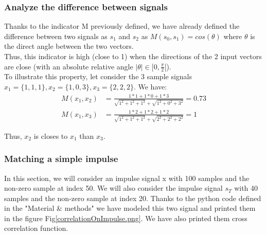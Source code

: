 \documentclass[a4paper]{article}
\begin{document}
    \subsubsection{Analyze the difference between signals}
    Thanks to the indicator M previously defined, we have already defined the difference between two signals as $s_{1}$ and $s_{2}$ as $M(s_{0}, s_{1})	= cos(\theta)$
    where $\theta$ is the direct angle between the two vectors.\\
    Thus, this indicator is high (close to 1) when the directions of the 2 input vectors are close (with an absolute relative angle $|\theta| \in [0, \frac{\pi}{2}[$).\\
    To illustrate this property, let consider the 3 sample signals $x_{1} = \{1, 1, 1\}, x_{2} = \{1, 0, 3\}, x_{3} = \{2, 2, 2\}$.  We have:
    \begin{equation*}
    \begin{aligned}
	    M(x_{1}, x_{2}) &= \frac{1*1 + 1*0 + 1*3}{\sqrt{1^2 + 1^2 + 1^2} + \sqrt{1^2 + 0^2 + 3^2}} = 0.73\\
	    M(x_{1}, x_{3}) &= \frac{1*2 + 1*2 + 1*2}{\sqrt{1^2 + 1^2 + 1^2} + \sqrt{2^2 + 2^2 + 2^2}} = 1
    \end{aligned}
    \end{equation*}

    Thus, $x_{2}$ is closes to $x_{1}$ than $x_{3}$.




	\subsubsection{Matching a simple impulse}
    In this section, we will consider an impulse signal x with 100 samples and the non-zero sample at index 50. We will also consider the impulse signal $s_{T}$ with 40 samples and the non-zero sample at index 20.   Thanks to the python code defined in the "Material \& methods" we have modeled this two signal and printed them in the figure Fig\ref{correlationOnImpulse.png}.  We have also printed them cross correlation function.
    
\end{document}
